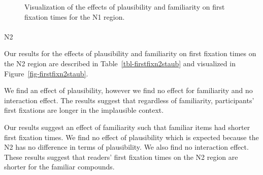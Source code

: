 \documentclass[
  12pt,
  letterpaper,
]{scrreprt}
\makeatletter
\let\oldparagraph\paragraph
\renewcommand{\paragraph}{
    \@ifstar
      \xxxParagraphStar
      \xxxParagraphNoStar
  }
\newcommand{\xxxParagraphStar}[1]{\oldparagraph*{#1}\mbox{}}
\newcommand{\xxxParagraphNoStar}[1]{\oldparagraph{#1}\mbox{}}
\makeatother
\begin{document}
\begin{figure}[htbp]

\caption{\label{fig-firstfixn1staub}Visualization of the effects of
plausibility and familiarity on first fixation times for the N1 region.}


\end{figure}%

\paragraph{N2}\label{n2}

Our results for the effects of plausibility and familiarity on first
fixation times on the N2 region are described in
Table~\ref{tbl-firstfixn2staub} and visualized in
Figure~\ref{fig-firstfixn2staub}.

We find an effect of plausibility, however we find no effect for
familiarity and no interaction effect. The results suggest that
regardless of familiarity, participants' first fixations are longer in
the implausible context.

Our results suggest an effect of familiarity such that familiar items
had shorter first fixation times. We find no effect of plausibility
which is expected because the N2 has no difference in terms of
plausibility. We also find no interaction effect. These results suggest
that readers' first fixation times on the N2 region are shorter for the
familiar compounds.
\end{document}
